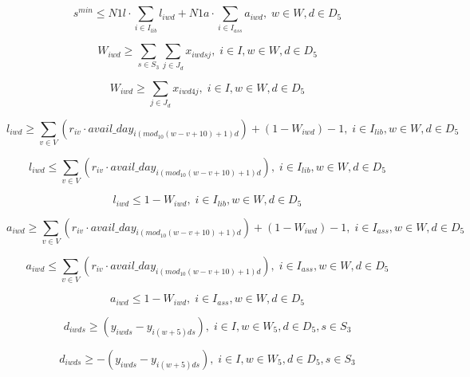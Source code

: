 \begin{equation}
s^{min} \leq N1l \cdot \sum_{i \in I_{lib}} l_{iwd} + N1a \cdot \sum_{i \in I_{ass}} a_{iwd}, \; w \in W, d \in D_5
\end{equation}

\begin{equation}
W_{iwd} \geq \sum_{s \in S_3} \sum_{j \in J_d} x_{iwdsj}, \; i \in I, w \in W, d \in D_5
\end{equation}

\begin{equation}
W_{iwd} \geq \sum_{j \in J_d} x_{iwd4j}, \; i \in I, w \in W, d \in D_5
\end{equation}

\begin{equation}
l_{iwd} \geq \sum_{v \in V} (r_{iv} \cdot avail\_day_{i(mod_{10}(w-v+10)+1)d}) + (1-W_{iwd}) - 1, \; i \in I_{lib}, w \in W, d \in D_5
\end{equation}

\begin{equation}
l_{iwd} \leq \sum_{v \in V} (r_{iv} \cdot avail\_day_{i(mod_{10}(w-v+10)+1)d}), \; i \in I_{lib}, w \in W, d \in D_5
\end{equation}

\begin{equation}
l_{iwd} \leq 1-W_{iwd}, \; i \in I_{lib}, w \in W, d \in D_5
\end{equation}

\begin{equation}
a_{iwd} \geq \sum_{v \in V} (r_{iv} \cdot avail\_day_{i(mod_{10}(w-v+10)+1)d}) + (1-W_{iwd}) - 1, \; i \in I_{ass}, w \in W, d \in D_5
\end{equation}

\begin{equation}
a_{iwd} \leq \sum_{v \in V} (r_{iv} \cdot avail\_day_{i(mod_{10}(w-v+10)+1)d}), \; i \in I_{ass}, w \in W, d \in D_5
\end{equation}

\begin{equation}
a_{iwd} \leq 1-W_{iwd}, \; i \in I_{ass}, w \in W, d \in D_5
\end{equation}

\begin{equation}
d_{iwds} \geq (y_{iwds} - y_{i(w+5)ds}), \; i \in I, w \in W_5, d \in D_5, s \in S_3
\end{equation}

\begin{equation}
d_{iwds} \geq -(y_{iwds} - y_{i(w+5)ds}), \; i \in I, w \in W_5, d \in D_5, s \in S_3
\end{equation}

